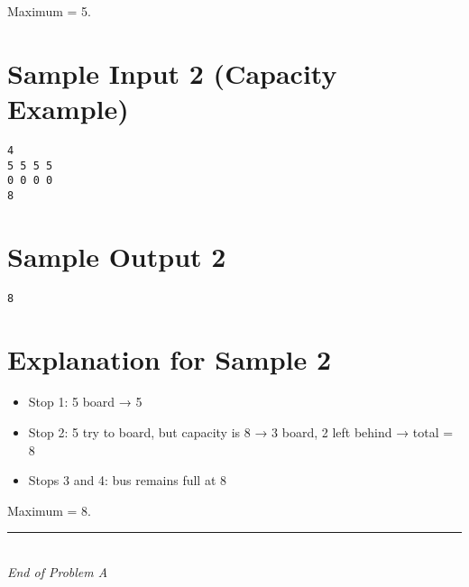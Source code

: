 \documentclass[12pt,a4paper]{article}
\begin{document}
Maximum = 5.

\section*{Sample Input 2 (Capacity Example)}
\begin{verbatim}
4
5 5 5 5
0 0 0 0
8
\end{verbatim}

\section*{Sample Output 2}
\begin{verbatim}
8
\end{verbatim}

\section*{Explanation for Sample 2}
\begin{itemize}
  \item Stop 1: 5 board → 5  
  \item Stop 2: 5 try to board, but capacity is 8 → 3 board, 2 left behind → total = 8  
  \item Stops 3 and 4: bus remains full at 8  
\end{itemize}

Maximum = 8.

\vfill
\begin{center}
    \rule{0.8\textwidth}{0.4pt} \\[0.5em]
    \textit{End of Problem A}
\end{center}
\end{document}
